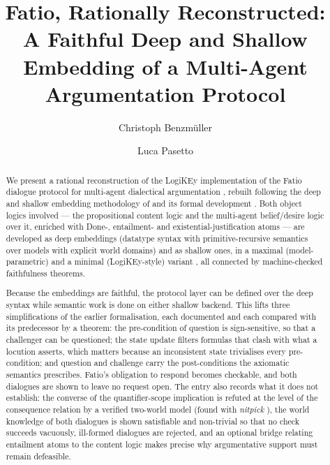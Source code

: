 \documentclass[11pt,a4paper]{article}
\begin{document}
\title{Fatio, Rationally Reconstructed:\\A Faithful Deep and Shallow Embedding of a
Multi-Agent Argumentation Protocol}
\author{Christoph Benzm\"uller \and Luca Pasetto}
\maketitle

\begin{abstract}
We present a rational reconstruction of the LogiKEy implementation
\cite{PasettoBenzmueller2024} of the Fatio dialogue protocol for multi-agent
dialectical argumentation \cite{McBurneyParsons2005}, rebuilt following the deep
and shallow embedding methodology of \cite{Benzmueller2025Faithful} and its formal
development \cite{FaithfulPMLinHOL-AFP}. Both object logics involved --- the
propositional content logic and the multi-agent belief/desire logic over it,
enriched with Done-, entailment- and existential-justification atoms --- are
developed as deep embeddings (datatype syntax with primitive-recursive semantics
over models with explicit world domains) and as shallow ones, in a maximal
(model-parametric) and a minimal (LogiKEy-style) variant \cite{LogiKEy2020}, all
connected by machine-checked faithfulness theorems.

Because the embeddings are faithful, the protocol layer can be defined over the
deep syntax while semantic work is done on either shallow backend. This lifts
three simplifications of the earlier formalisation, each documented and each
compared with its predecessor by a theorem: the pre-condition of question is
sign-sensitive, so that a challenger can be questioned; the state update filters
formulas that clash with what a locution asserts, which matters because an
inconsistent state trivialises every pre-condition; and question and challenge
carry the post-conditions the axiomatic semantics prescribes. Fatio's obligation
to respond becomes checkable, and both dialogues are shown to leave no request
open. The entry also records what it does not establish: the converse of the
quantifier-scope implication is refuted at the level of the consequence relation
by a verified two-world model (found with \emph{nitpick} \cite{Nitpick2010}), the
world knowledge of both dialogues is shown satisfiable and non-trivial so that no
check succeeds vacuously, ill-formed dialogues are rejected, and an optional
bridge relating entailment atoms to the content logic makes precise why
argumentative support must remain defeasible.
\end{abstract}

\tableofcontents





\end{document}
